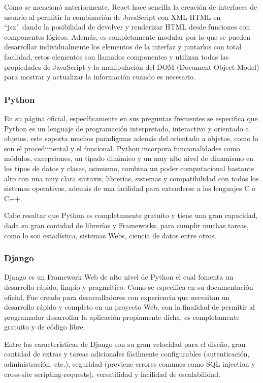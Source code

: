 Como se mencionó anteriormente, React hace sencilla la creación de interfaces
de usuario al permitir la combinación de JavaScript con XML-HTML en ``jsx"\  dando
la posibilidad de devolver y renderizar HTML desde funciones con componentes
lógicos. Además, es completamente modular por lo que se pueden desarrollar
individualmente los elementos de la interfaz y juntarlos con total facilidad,
estos elementos son llamados componentes y utilizan todas las propiedades de
JavaScript y la manipulación del DOM (Document Object Model) para mostrar
y actualizar la información cuando es necesario.


\subsubsection{Python}

En su página oficial, específicamente en sus preguntas frecuentes
\textcite{pythonDocs} se especifica que Python es un lenguaje de programación
interpretado, interactivo y orientado a objetos, este soporta muchos paradigmas
además del orientado a objetos, como lo son el procedimental y el funcional.
Python incorpora funcionalidades como módulos, excepciones, un tipado dinámico
y un muy alto nivel de dinamismo en los tipos de datos y clases, asimismo,
combina un poder computacional bastante alto con una muy clara sintaxis,
librerías, sistemas y compatibilidad con todos los sistemas operativos, además
de una facilidad para extenderse a los lenguajes C o C++.

Cabe resaltar que Python es completamente gratuito y tiene una gran capacidad,
dada su gran cantidad de librerías y Frameworks, para cumplir muchas tareas,
como lo son estadística, sistemas Webs, ciencia de datos entre otros.

\subsubsection{Django}

Django es un Framework Web de alto nivel de Python el cual fomenta un
desarrollo rápido, limpio y pragmático. Como se especifica en su documentación
oficial,
\textcite{DjangoDoc} Fue creado para desarrolladores con experiencia que necesitan
un desarrollo rápido y completo en un proyecto Web, con la finalidad de
permitir al programador desarrollar la aplicación propiamente dicha, es
completamente gratuito y de código libre.

Entre las características de Django son su gran velocidad para el diseño, gran
cantidad de extras y tareas adicionales fácilmente configurables
(autenticación, administración, etc.), seguridad (previene errores comunes
como SQL injection y  cross-site scripting-requests), versatilidad y facilidad
de escalabilidad.

